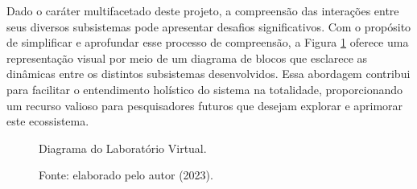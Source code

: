 Dado o caráter multifacetado deste projeto, a compreensão das interações entre seus diversos subsistemas pode apresentar desafios significativos. Com o propósito de simplificar e aprofundar esse processo de compreensão, a Figura \ref{fig3:image_17} oferece uma representação visual por meio de um diagrama de blocos que esclarece as dinâmicas entre os distintos subsistemas desenvolvidos. Essa abordagem contribui para facilitar o entendimento holístico do sistema na totalidade, proporcionando um recurso valioso para pesquisadores futuros que desejam explorar e aprimorar este ecossistema.


\begin{figure}[!h]
	\centering
	\caption{Diagrama do Laboratório Virtual.}
	\caption*{Fonte: elaborado pelo autor (2023).}
	\label{fig3:image_17}
\end{figure}
